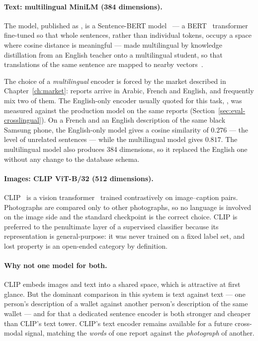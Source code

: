 \paragraph{Text: multilingual MiniLM (384 dimensions).} The model,
published as , is a Sentence-BERT
model~\cite{reimers2019sbert} --- a BERT~\cite{devlin2019bert}
transformer~\cite{vaswani2017attention} fine-tuned so that whole sentences,
rather than individual tokens, occupy a space where cosine distance is
meaningful --- made multilingual by knowledge distillation from an English
teacher onto a multilingual student, so that translations of the same sentence
are mapped to nearby vectors~\cite{reimers2020multilingual}.

The choice of a \emph{multilingual} encoder is forced by the market described in
Chapter~\ref{ch:market}: reports arrive in Arabic, French and English, and
frequently mix two of them. The English-only encoder usually quoted for this
task, , was measured against the production model on the
same reports (Section~\ref{sec:eval-crosslingual}). On a French and an English
description of the same black Samsung phone, the English-only model gives a
cosine similarity of $0.276$ --- the level of unrelated sentences --- while the
multilingual model gives $0.817$. The multilingual model also produces 384
dimensions, so it replaced the English one without any change to the database
schema.

\paragraph{Images: CLIP ViT-B/32 (512 dimensions).}
CLIP~\cite{radford2021clip} is a vision transformer~\cite{dosovitskiy2021vit}
trained contrastively on image--caption pairs. Photographs are compared only to
other photographs, so no language is involved on the image side and the standard
checkpoint is the correct choice. CLIP is preferred to the penultimate layer of
a supervised classifier because its representation is general-purpose: it was
never trained on a fixed label set, and lost property is an open-ended category
by definition.

\paragraph{Why not one model for both.} CLIP embeds images and text into a
shared space, which is attractive at first glance. But the dominant comparison
in this system is text against text --- one person's description of a wallet
against another person's description of the same wallet --- and for that a
dedicated sentence encoder is both stronger and cheaper than CLIP's text tower.
CLIP's text encoder remains available for a future cross-modal signal, matching
the \emph{words} of one report against the \emph{photograph} of another.

